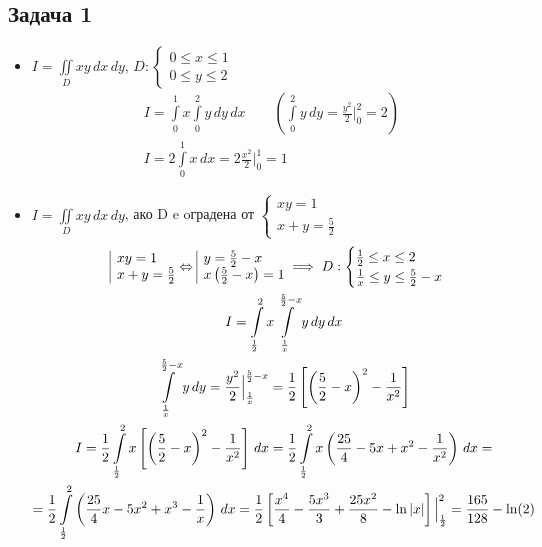 \documentclass[a4paper,fleqn,12pt]{article}
\theoremstyle{definition}
\begin{document}
\subsection*{Задача 1}
\begin{itemize}
\item $I = \iint\limits_D xy \,dx \,dy$, $D: \begin{cases} 0 \leq x \leq 1 \\ 0 \leq y \leq 2 \end{cases}$
\begin{gather*}
I = \int\limits_0 ^1 x \int\limits_0 ^2 y \, dy \, dx   \qquad \left( \int\limits_0 ^2 y \, dy = \frac{y^2}{2} \Big|_0 ^2 = 2 \right) \\
I = 2 \int\limits_0 ^1 x \, dx = 2\frac{x^2}{2} \Big|_0 ^1 = 1
\end{gather*}

\item $I = \iint\limits _D xy \,dx \,dy$, ако D e oградена от $\begin{cases} xy = 1 \\ x+y = \frac{5}{2} \end{cases}$
\begin{gather*}
\begin{array}{|l@{}}
xy = 1 \\
x+y = \frac{5}{2}
\end{array} \Leftrightarrow
\begin{array}{|l@{}}
y = \frac{5}{2} - x \\
x \left( \frac{5}{2} - x \right) = 1 
\end{array}\implies 
D: \begin{cases} 
\frac{1}{2} \leq x \leq 2 \\
\frac{1}{x} \leq y \leq \frac{5}{2} - x
\end{cases}\\
I = \int\limits_{\frac{1}{2}} ^2 x \int\limits_{\frac{1}{x}} ^{\frac{5}{2} - x} y \, dy \, dx \\
\int\limits_{\frac{1}{x}} ^{\frac{5}{2} - x} y \, dy  = \frac{y^2}{2} \Big|_{\frac{1}{x}} ^{\frac{5}{2} - x} = \frac{1}{2}\left[ \left( \frac{5}{2} - x\right)^2 - \frac{1}{x^2} \right] \\
I = \frac{1}{2} \int\limits_{\frac{1}{2}} ^2 x \left[ \left( \frac{5}{2} - x\right)^2 - \frac{1}{x^2} \right] \, dx = \frac{1}{2} \int\limits_{\frac{1}{2}} ^2 x \left( \frac{25}{4} - 5x + x^2 - \frac{1}{x^2} \right) \, dx = \\
= \frac{1}{2} \int\limits_{\frac{1}{2}} ^2  \left( \frac{25}{4}x - 5x^2 + x^3 - \frac{1}{x} \right) \, dx = \frac{1}{2} \left[ \frac{x^4}{4} - \frac{5x^3}{3} + \frac{25x^2}{8} - \ln|x| \right] \Big|_{\frac{1}{2}} ^2 = \frac{165}{128} - \ln(2)
\end{gather*}


\end{itemize}
\end{document}
